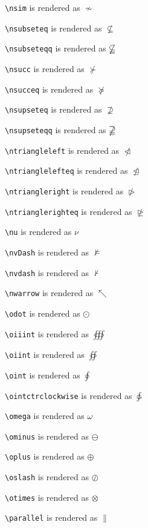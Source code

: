 \texttt{\textbackslash nsim} is rendered as $\nsim$

\texttt{\textbackslash nsubseteq} is rendered as $\nsubseteq$

\texttt{\textbackslash nsubseteqq} is rendered as $\nsubseteqq$

\texttt{\textbackslash nsucc} is rendered as $\nsucc$

\texttt{\textbackslash nsucceq} is rendered as $\nsucceq$

\texttt{\textbackslash nsupseteq} is rendered as $\nsupseteq$

\texttt{\textbackslash nsupseteqq} is rendered as $\nsupseteqq$

\texttt{\textbackslash ntriangleleft} is rendered as $\ntriangleleft$

\texttt{\textbackslash ntrianglelefteq} is rendered as $\ntrianglelefteq$

\texttt{\textbackslash ntriangleright} is rendered as $\ntriangleright$

\texttt{\textbackslash ntrianglerighteq} is rendered as $\ntrianglerighteq$

\texttt{\textbackslash nu} is rendered as $\nu$

\texttt{\textbackslash nvDash} is rendered as $\nvDash$

\texttt{\textbackslash nvdash} is rendered as $\nvdash$

\texttt{\textbackslash nwarrow} is rendered as $\nwarrow$

\texttt{\textbackslash odot} is rendered as $\odot$

\texttt{\textbackslash oiiint} is rendered as $\oiiint$

\texttt{\textbackslash oiint} is rendered as $\oiint$

\texttt{\textbackslash oint} is rendered as $\oint$

\texttt{\textbackslash ointctrclockwise} is rendered as $\ointctrclockwise$

\texttt{\textbackslash omega} is rendered as $\omega$

\texttt{\textbackslash ominus} is rendered as $\ominus$

\texttt{\textbackslash oplus} is rendered as $\oplus$

\texttt{\textbackslash oslash} is rendered as $\oslash$

\texttt{\textbackslash otimes} is rendered as $\otimes$

\texttt{\textbackslash parallel} is rendered as $\parallel$

